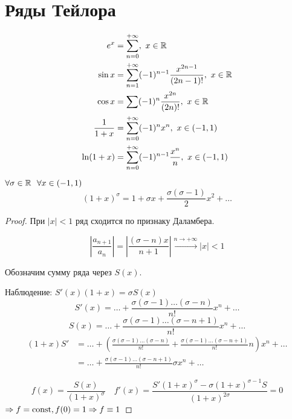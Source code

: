 

\cfoot{}



\section*{Ряды Тейлора}

\begin{example}
    \begin{align*}
        e^x             & = \sum_{n = 0}^{ +\infty},\ x\in\R                                             \\
        \sin x          & = \sum_{n = 1}^{ +\infty} ( - 1)^{n - 1} \frac{x^{2n - 1}}{(2n - 1)!},\ x\in\R \\
        \cos x          & = \sum ( - 1)^n \frac{x^{2n}}{(2n)!},\ x\in\R                                  \\
        \frac{1}{1 + x} & = \sum_{n = 0}^{ +\infty} ( -1)^nx^n,\ x\in( - 1, 1)                           \\
        \ln(1 + x)      & = \sum_{n = 0}^{ +\infty} ( - 1)^{n - 1}\frac{x^n}{n},\ x\in( - 1, 1)          \\
    \end{align*}
\end{example}

\begin{theorem}
    \(\forall \sigma\in\mathbb{R} \ \ \forall x\in( - 1, 1)\)
    \[(1 + x)^{\sigma} = 1 + \sigma x + \frac{\sigma(\sigma - 1)}{2} x^2 + \dots \]
\end{theorem}
\begin{proof}
    При \(|x|< 1\) ряд сходится по признаку Даламбера.

    \[\left|\frac{a_{n+1}}{a_n}\right|=\left|\frac{(\sigma - n)x}{n + 1} \right| \xrightarrow{n\to +\infty}|x|< 1\]

    Обозначим сумму ряда через \(S(x)\).

    Наблюдение: \(S'(x)(1 + x) = \sigma S(x)\)
    \[S'(x) = \dots + \frac{\sigma(\sigma - 1)\dots (\sigma - n)}{n!} x^n + \dots \]
    \[S(x) = \dots + \frac{\sigma(\sigma - 1)\dots (\sigma - n + 1)}{n!} x^n + \dots \]
    \begin{align*}
        (1 + x)S' & = \dots + \left( \frac{\sigma(\sigma - 1)\dots (\sigma - n)}{n!} + \frac{\sigma(\sigma - 1)\dots (\sigma - n + 1)}{n!}n \right)x^n + \dots \\
                  & = \dots + \frac{\sigma(\sigma - 1)\dots (\sigma - n + 1)}{n!}\sigma x^n + \dots
    \end{align*}

    \[f(x) = \frac{S(x)}{(1 + x)^\sigma} \quad f'(x) = \frac{S'(1 + x)^\sigma - \sigma(1 + x)^{\sigma - 1}S}{(1 + x)^{2\sigma}} = 0\]
    \(\Rightarrow f = \text{const}, f(0) = 1\Rightarrow f\equiv 1\)
\end{proof}

